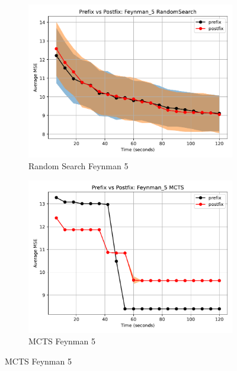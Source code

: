 \documentclass[12pt]{iopart}
\begin{document}
\begin{figure}
    \centering
    
    \begin{subfigure}[b]{0.4\textwidth}
        \includegraphics[width=\linewidth, keepaspectratio]{AIFeynman_Benchmarks/PrePostFeynman_5RandomSearch.pdf}
        \caption{Random Search Feynman 5}
        \label{subfig:feynman_5_RS}
    \end{subfigure}
    \begin{subfigure}[b]{0.4\textwidth}
        \includegraphics[width=\linewidth, keepaspectratio]{AIFeynman_Benchmarks/PrePostFeynman_5MCTS.pdf}
        \caption{MCTS Feynman 5}
        \label{subfig:feynman_5_MCTS}
    \end{subfigure}
    

\end{figure}
\end{document}
